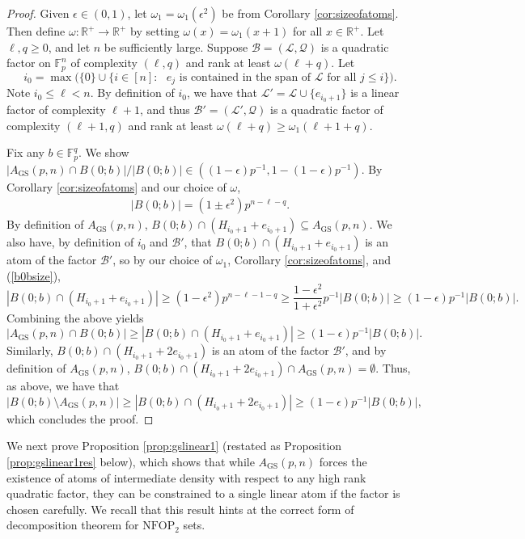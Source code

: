 \documentclass[12pt,oneside,british,a4wide]{amsart}
\numberwithin{equation}{section}
\theoremstyle{definition}
\def\F{\mathbb{F}}
\def\NFOP{\mathrm{NFOP}}
\def\GS{\mathrm{GS}}
\def\e{\epsilon}
\newcommand{\calL}{\mathcal{L}}
\newcommand{\calB}{\mathcal{B}}
\newcommand{\calQ}{\mathcal{Q}}
\begin{document}
\begin{proof}
Given $\e\in (0,1)$, let $\omega_1=\omega_1(\e^2)$ be from Corollary \ref{cor:sizeofatoms}.  Then define $\omega:\mathbb{R}^+\rightarrow \mathbb{R}^+$ by setting $\omega(x)=\omega_1(x+1)$ for all $x\in \mathbb{R}^+$.   Let $\ell,q\geq 0$, and let $n$ be sufficiently large. Suppose $\calB=(\calL,\calQ)$ is a quadratic factor on $\mathbb{F}_p^n$ of complexity $(\ell,q)$ and rank at least $\omega(\ell+q)$.  Let
$$
i_0=\max\Big(\{0\}\cup \{i\in [n]: \text{ $e_j$ is contained in the span of $\calL$ for all $j\leq i$}\}\Big).
$$ 
Note $i_0\leq \ell<n$.  By definition of $i_0$, we have that $\calL'=\calL\cup \{e_{i_0+1}\}$ is a linear factor of complexity 
$\ell+1$, and thus $\calB'=(\calL',\calQ)$ is a quadratic factor of complexity $(\ell+1,q)$ and rank at least $\omega(\ell+q)\geq \omega_1(\ell+1+q)$.  

Fix any $b\in \F_p^q$.  We show $| A_{\GS}(p,n)\cap B(0;b)|/|B(0;b)|\in ((1-\e)p^{-1},1-(1-\e)p^{-1})$. By Corollary \ref{cor:sizeofatoms} and our choice of $\omega$,
\begin{align}\label{b0bsize}
|B(0;b)|=(1\pm \e^2)p^{n-\ell-q}.
\end{align}
By definition of $A_\GS(p,n)$, $B(0;b)\cap (H_{i_0+1}+e_{i_0+1})\subseteq A_{\GS}(p,n)$. We also have, by definition of $i_0$ and $\calB'$,  that $B(0;b)\cap (H_{i_0+1}+e_{i_0+1})$ is an atom of the factor $\calB'$, so by our choice of $\omega_1$, Corollary \ref{cor:sizeofatoms}, and (\ref{b0bsize}),
$$
|B(0;b)\cap (H_{i_0+1}+e_{i_0+1})|\geq (1- \e^2)p^{n-\ell-1-q}\geq \frac{1- \e^2}{1+ \e^2}p^{-1}|B(0;b)|\geq (1-\e)p^{-1}|B(0;b)|.
$$
Combining the above yields
\[|A_\GS(p,n)\cap B(0;b)|\geq |B(0;b)\cap (H_{i_0+1}+e_{i_0+1})|\geq (1-\e)p^{-1}|B(0;b)|.\]
Similarly, $B(0;b)\cap (H_{i_0+1}+2e_{i_0+1})$ is an  atom  of the factor $\calB'$, and  by definition of $A_\GS(p,n)$, $B(0;b)\cap (H_{i_0+1}+2e_{i_0+1})\cap A_{\GS}(p,n)=\emptyset$. Thus, as above, we have that
\[|B(0;b)\setminus A_\GS(p,n)|\geq |B(0;b)\cap (H_{i_0+1}+2e_{i_0+1})|\geq (1-\e)p^{-1}|B(0;b)|,\]
which concludes the proof.
\end{proof}

We next prove Proposition \ref{prop:gslinear1} (restated as Proposition \ref{prop:gslinear1res} below), which shows that while $A_{\GS}(p,n)$ forces the existence of atoms of intermediate density with respect to any high rank quadratic factor, they can be constrained to a single linear atom if the factor is chosen carefully.  We recall that this result hints at the correct form of decomposition theorem for $\NFOP_2$ sets.
\end{document}
